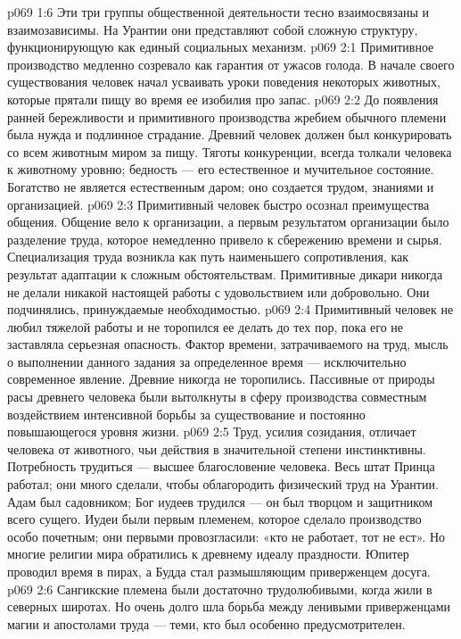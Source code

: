 \vs p069 1:6 \pc Эти три группы общественной деятельности тесно взаимосвязаны и взаимозависимы. На Урантии они представляют собой сложную структуру, функционирующую как единый социальных механизм.
\vs p069 2:1 Примитивное производство медленно созревало как гарантия от ужасов голода. В начале своего существования человек начал усваивать уроки поведения некоторых животных, которые прятали пищу во время ее изобилия про запас.
\vs p069 2:2 До появления ранней бережливости и примитивного производства жребием обычного племени была нужда и подлинное страдание. Древний человек должен был конкурировать со всем животным миром за пищу. Тяготы конкуренции, всегда толкали человека к животному уровню; бедность --- его естественное и мучительное состояние. Богатство не является естественным даром; оно создается трудом, знаниями и организацией.
\vs p069 2:3 Примитивный человек быстро осознал преимущества общения. Общение вело к организации, а первым результатом организации было разделение труда, которое немедленно привело к сбережению времени и сырья. Специализация труда возникла как путь наименьшего сопротивления, как результат адаптации к сложным обстоятельствам. Примитивные дикари никогда не делали никакой настоящей работы с удовольствием или добровольно. Они подчинялись, принуждаемые необходимостью.
\vs p069 2:4 Примитивный человек не любил тяжелой работы и не торопился ее делать до тех пор, пока его не заставляла серьезная опасность. Фактор времени, затрачиваемого на труд, мысль о выполнении данного задания за определенное время --- исключительно современное явление. Древние никогда не торопились. Пассивные от природы расы древнего человека были вытолкнуты в сферу производства совместным воздействием интенсивной борьбы за существование и постоянно повышающегося уровня жизни.
\vs p069 2:5 Труд, усилия созидания, отличает человека от животного, чьи действия в значительной степени инстинктивны. Потребность трудиться --- высшее благословение человека. Весь штат Принца работал; они много сделали, чтобы облагородить физический труд на Урантии. Адам был садовником; Бог иудеев трудился --- он был творцом и защитником всего сущего. Иудеи были первым племенем, которое сделало производство особо почетным; они первыми провозгласили: «кто не работает, тот не ест». Но многие религии мира обратились к древнему идеалу праздности. Юпитер проводил время в пирах, а Будда стал размышляющим приверженцем досуга.
\vs p069 2:6 Сангикские племена были достаточно трудолюбивыми, когда жили в северных широтах. Но очень долго шла борьба между ленивыми приверженцами магии и апостолами труда --- теми, кто был особенно предусмотрителен.
